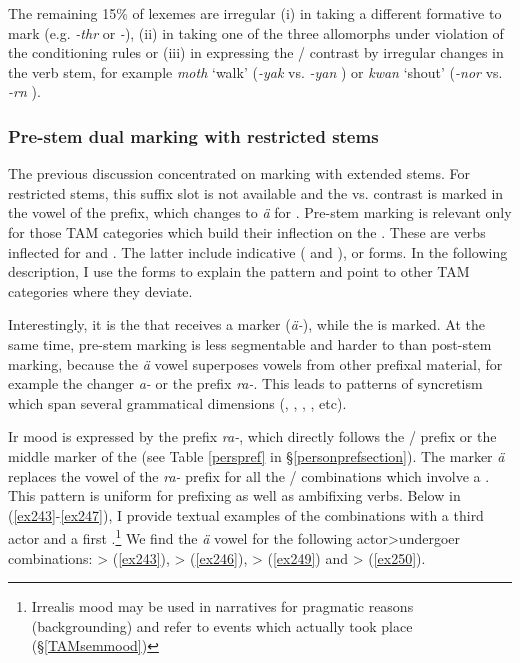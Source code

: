 The remaining 15\% of  lexemes are irregular (i) in taking a different formative to mark  (e.g. \emph{-thr} or \emph{-\Zero}), (ii) in taking one of the three allomorphs under violation of the conditioning rules or (iii) in expressing the / contrast by irregular changes in the verb stem, for example \emph{moth} `walk' (\emph{-yak} \Ndu{} vs. \emph{-yan} \Du) or \emph{kwan} `shout' (\emph{-nor} \Ndu{} vs. \emph{-rn} \Du).

\subsubsection{Pre-stem dual marking with restricted stems} \label{prerootdual}

The previous discussion concentrated on  marking with extended stems. For restricted stems, this suffix slot is not available and the  vs.  contrast is marked in the vowel of the prefix, which changes to \emph{ä} for . Pre-stem  marking is relevant only for those TAM categories which build their inflection on the . These are verbs inflected for  and  . The latter include indicative ( and  ),  or  forms. In the following description, I use the   forms to explain the pattern and point to other TAM categories where they deviate.%

Interestingly, it is the  that receives a marker (\emph{ä-}), while the  is  marked. At the same time, pre-stem  marking is less segmentable and harder to  than post-stem  marking, because the  \emph{ä} vowel superposes vowels from other prefixal material, for example the  changer \emph{a-} or the  prefix \emph{ra-}. This leads to patterns of syncretism which span several grammatical dimensions (, , , , etc).%

Ir mood is expressed by the prefix \emph{ra-}, which directly follows the / prefix or the middle marker of the \Bet{}  (see Table \ref{perspref} in \S{}\ref{personprefsection}). The  marker \emph{ä} replaces the vowel of the \emph{ra-} prefix for all the / combinations which involve a  . This pattern is uniform for prefixing as well as ambifixing verbs. Below in (\ref{ex243}-\ref{ex247}), I provide textual examples of the  combinations with a third  actor and a first  .\footnote{Irrealis mood may be used in narratives for pragmatic reasons (backgrounding) and refer to events which actually took place (\S{}\ref{TAMsemmood})} We find the \emph{ä} vowel for the following actor>undergoer combinations: \Sg>\Sg{} (\ref{ex243}), \Pl>\Sg{} (\ref{ex246}), \Sg>\Pl{} (\ref{ex249}) and \Pl>\Pl{} (\ref{ex250}).

